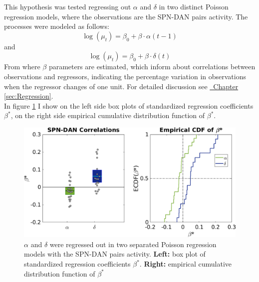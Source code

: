This hypothesis was tested regressing out $\alpha$ and $\delta$ in two distinct Poisson regression models, where the observations are the SPN-DAN pairs activity. The processes were modeled as follows:
\begin{equation*}
    \log(\mu_t)=\beta_0+\beta\cdot\alpha(t-1)
\end{equation*}
and 
\begin{equation*}
    \log(\mu_t)=\beta_0+\beta\cdot\delta(t)
\end{equation*}
From where $\beta$ parameters are estimated, which inform about correlations between observations and regressors, indicating the percentage variation in observations when the regressor changes of one unit. For detailed discussion see \hyperref[sec:Regression]{~Chapter \ref*{sec:Regression}}.\\
In figure \ref{fig:RL_alphadelta} I show on the left side box plots of standardized regression coefficients $\beta^*$, on the right side empirical cumulative distribution function of $\beta^*$.\\
\begin{figure}
   \centering
    \includegraphics[scale=0.45]{figures/AlphaAndDeltaPavSPN3.png}
    \caption{$\alpha$ and $\delta$ were regressed out in two separated Poisson regression models with the SPN-DAN pairs activity. \textbf{Left:} box plot of standardized regression coefficients $\beta^*$. \textbf{Right:} empirical cumulative distribution function of $\beta^*$}
    \label{fig:RL_alphadelta}
\end{figure}
